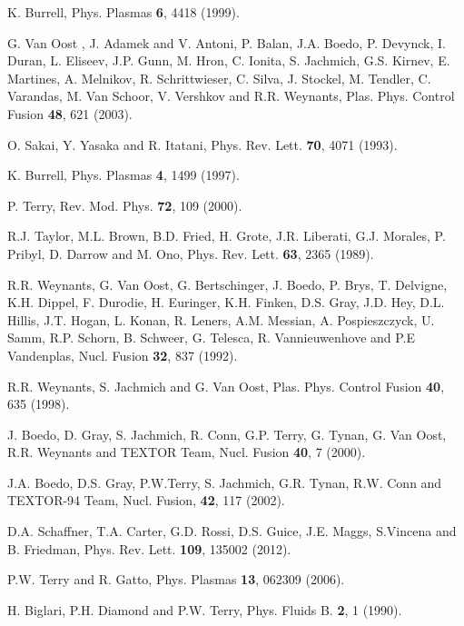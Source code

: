 \documentclass[aip,pop,amsmath,amssymb,preprint,superscriptaddress]{revtex4-1} %
\begin{document}
\providecommand{\noopsort}[1]{}\providecommand{\singleletter}[1]{#1}%
\begin{thebibliography}{10}

K. Burrell, Phys. Plasmas {\bf 6},  4418  (1999).

G. Van Oost , J. Adamek and V. Antoni, P. Balan, J.A. Boedo, P. Devynck, I. Duran, L. Eliseev, J.P. Gunn, M. Hron, C. Ionita, S. Jachmich, G.S. Kirnev, E. Martines, A. Melnikov, R. Schrittwieser, C. Silva, J. Stockel, M. Tendler, C. Varandas, M. Van Schoor, V. Vershkov and R.R. Weynants, Plas. Phys. Control Fusion {\bf 48}, 621 (2003).

O. Sakai, Y. Yasaka and R. Itatani, Phys. Rev. Lett. {\bf 70},  4071 (1993).

K. Burrell, Phys. Plasmas {\bf 4},  1499  (1997).

P. Terry, Rev. Mod. Phys. {\bf 72},  109  (2000).

R.J. Taylor, M.L. Brown, B.D. Fried, H. Grote, J.R. Liberati, G.J. Morales, P. Pribyl, D. Darrow and M. Ono, Phys. Rev. Lett. {\bf 63},  2365  (1989).

R.R. Weynants, G. Van Oost, G. Bertschinger, J. Boedo, P. Brys, T. Delvigne, K.H. Dippel, F. Durodie, H. Euringer, K.H. Finken, D.S. Gray, J.D. Hey, D.L. Hillis, J.T. Hogan, L. Konan, R. Leners, A.M. Messian, A. Pospieszczyck, U. Samm, R.P. Schorn, B. Schweer, G. Telesca, R. Vannieuwenhove and P.E Vandenplas, Nucl. Fusion {\bf 32},  837  (1992).

R.R. Weynants, S. Jachmich and G. Van Oost, Plas. Phys. Control Fusion {\bf 40}, 635 (1998).

J. Boedo, D. Gray, S. Jachmich, R. Conn, G.P. Terry, G. Tynan, G. Van Oost, R.R. Weynants and TEXTOR Team, Nucl. Fusion {\bf 40},  7  (2000).

J.A. Boedo, D.S. Gray, P.W.Terry, S. Jachmich, G.R. Tynan, R.W. Conn and TEXTOR-94 Team, Nucl. Fusion, {\bf 42}, 117 (2002).

D.A. Schaffner, T.A. Carter, G.D. Rossi, D.S. Guice, J.E. Maggs, S.Vincena and B. Friedman, Phys. Rev. Lett. {\bf 109}, 135002 (2012).

P.W. Terry and R. Gatto, Phys. Plasmas {\bf 13}, 062309 (2006).

H. Biglari, P.H. Diamond and P.W. Terry, Phys. Fluids B. {\bf 2},  1  (1990).


\end{thebibliography}
\end{document}
